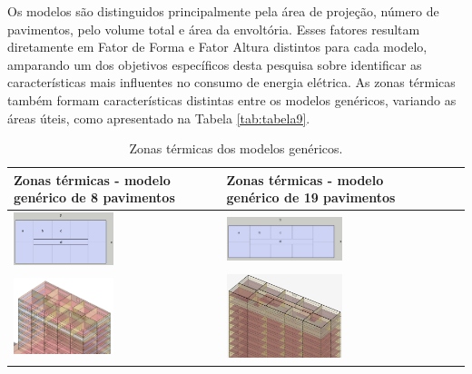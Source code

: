 \noindent Os modelos são distinguidos principalmente pela área de projeção, número de pavimentos, pelo
volume total e área da envoltória. Esses fatores resultam diretamente em Fator de Forma e Fator
Altura distintos para cada modelo, amparando um dos objetivos específicos desta pesquisa sobre
identificar as características mais influentes no consumo de energia elétrica. As zonas térmicas 
também formam características distintas entre os modelos genéricos, variando as áreas úteis,
como apresentado na Tabela \ref{tab:tabela9}.
\begin{table}[H]
    \centering
    \caption{\small Zonas térmicas dos modelos genéricos.}
    \begin{tabular*}{\columnwidth}{@{\extracolsep{\fill}}ll}\hline
        \makecell[c]{Zonas térmicas - modelo\\ genérico de 8 pavimentos}                    & \makecell[c]{Zonas térmicas - modelo \\genérico de 19 pavimentos}                 \\ \hline
        \includegraphics[width=0.5\textwidth]{figures/tab9-pb-8pav.png}                     & \includegraphics[width=0.5\textwidth]{figures/tab9-pb-19pav.png}                  \\
        \includegraphics[width=0.5\textwidth]{figures/tab9-CEP_8pav-v3-7.png}               & \includegraphics[width=0.5\textwidth]{figures/tab9-corte-19pav-v1.png}            \\ \hline

\end{tabular*}
\end{table}
